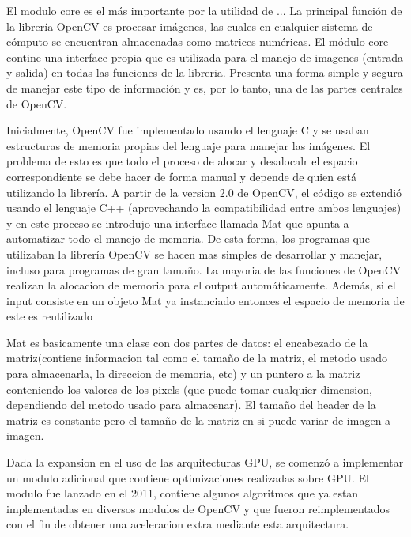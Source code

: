 \documentclass[a4paper,10pt]{report}
\begin{document}
El modulo core es el más importante por la utilidad de ...
La principal función de la librería OpenCV es procesar imágenes, las cuales en cualquier sistema de cómputo se encuentran almacenadas como matrices numéricas. 
El módulo core contine una interface propia que es utilizada para el manejo de imagenes (entrada y salida) en todas las funciones de la libreria. 
Presenta una forma simple y segura de manejar este tipo de información y es, por lo tanto, una de las partes centrales de OpenCV.

Inicialmente, OpenCV fue implementado usando el lenguaje C y se usaban estructuras de memoria propias del lenguaje para manejar las imágenes. 
El problema de esto es que todo el proceso de alocar y desalocalr el espacio correspondiente se debe hacer de forma manual y depende de quien está utilizando la librería. 
A partir de la version 2.0 de OpenCV, el código se extendió usando el lenguaje C++ (aprovechando la compatibilidad entre ambos lenguajes) y en este proceso se introdujo una interface llamada Mat que apunta a automatizar todo el manejo de memoria. 
De esta forma, los programas que utilizaban la librería OpenCV se hacen mas simples de desarrollar y manejar, incluso para programas de gran tamaño.
La mayoria de las funciones de OpenCV realizan la alocacion de memoria para el output automáticamente. 
Además, si el input consiste en un objeto Mat ya instanciado entonces el espacio de memoria de este es reutilizado

Mat es basicamente una clase con dos partes de datos: el encabezado de la matriz(contiene informacion tal como el tamaño de la matriz, el metodo usado para almacenarla, la direccion de memoria, etc) y un puntero a la matriz conteniendo los valores de los pixels (que puede tomar cualquier dimension, dependiendo del metodo usado para almacenar).
El tamaño del header de la matriz es constante pero el tamaño de la matriz en si puede variar de imagen a imagen.








Dada la expansion en el uso de las arquitecturas GPU, se comenzó a implementar un modulo adicional que contiene optimizaciones realizadas sobre GPU.
El modulo fue lanzado en el 2011, contiene algunos algoritmos que ya estan implementadas en diversos modulos de OpenCV y que fueron reimplementados con el fin de obtener una aceleracion extra mediante esta arquitectura.
\end{document}
